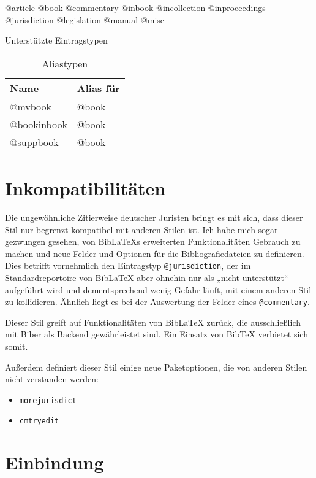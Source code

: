\documentclass[11pt,a4paper,DIV=calc]{scrartcl}
\newcommand\software[1]{\textsf{#1}}
\newcommand\Biblatex{\software{Bib\LaTeX{}}\xspace}
\begin{document}
\begin{table}
  \centering

  @article @book @commentary @inbook @incollection @inproceedings
  @jurisdiction @legislation @manual @misc

  \caption{Unterstützte Eintragstypen}
  \label{tab:unterstuetzte-typen}
\end{table}

\begin{table}
  \centering
  \begin{tabular}{ll}
    \textbf{Name} & \textbf{Alias für}\\
    \hline
    @mvbook         & @book\\
    @bookinbook     & @book\\
    @suppbook       & @book
  \end{tabular}
  \caption{Aliastypen}
  \label{tab:aliastypen}
\end{table}

\section{Inkompatibilitäten}\label{sec:inkompat}

Die ungewöhnliche Zitierweise deutscher Juristen bringt es mit sich,
dass dieser Stil nur begrenzt kompatibel mit anderen Stilen ist. Ich
habe mich sogar gezwungen gesehen, von \Biblatex{}s erweiterten
Funktionalitäten Gebrauch zu machen und neue Felder und Optionen für
die Bibliografiedateien zu definieren. Dies betrifft vornehmlich den
Eintragstyp \verb+@jurisdiction+, der im Standardreportoire von
\Biblatex aber ohnehin nur als „nicht unterstützt“ aufgeführt wird und
dementsprechend wenig Gefahr läuft, mit einem anderen Stil zu
kollidieren. Ähnlich liegt es bei der Auswertung der Felder eines
\verb+@commentary+.

Dieser Stil greift auf Funktionalitäten von \Biblatex zurück, die
ausschließlich mit \software{Biber} als Backend gewährleistet
sind. Ein Einsatz von \software{Bib\TeX{}} verbietet sich somit.

Außerdem definiert dieser Stil einige neue Paketoptionen, die von
anderen Stilen nicht verstanden werden:

\begin{itemize}
\item \verb+morejurisdict+
\item \verb+cmtryedit+
\end{itemize}

\section{Einbindung}
\end{document}
